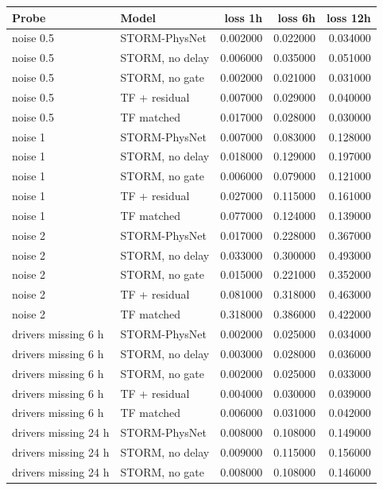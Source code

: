 \begin{tabular}{llrrr}
\toprule
Probe & Model & loss 1h & loss 6h & loss 12h \\
\midrule
noise 0.5 & STORM-PhysNet & 0.002000 & 0.022000 & 0.034000 \\
noise 0.5 & STORM, no delay & 0.006000 & 0.035000 & 0.051000 \\
noise 0.5 & STORM, no gate & 0.002000 & 0.021000 & 0.031000 \\
noise 0.5 & TF + residual & 0.007000 & 0.029000 & 0.040000 \\
noise 0.5 & TF matched & 0.017000 & 0.028000 & 0.030000 \\
noise 1 & STORM-PhysNet & 0.007000 & 0.083000 & 0.128000 \\
noise 1 & STORM, no delay & 0.018000 & 0.129000 & 0.197000 \\
noise 1 & STORM, no gate & 0.006000 & 0.079000 & 0.121000 \\
noise 1 & TF + residual & 0.027000 & 0.115000 & 0.161000 \\
noise 1 & TF matched & 0.077000 & 0.124000 & 0.139000 \\
noise 2 & STORM-PhysNet & 0.017000 & 0.228000 & 0.367000 \\
noise 2 & STORM, no delay & 0.033000 & 0.300000 & 0.493000 \\
noise 2 & STORM, no gate & 0.015000 & 0.221000 & 0.352000 \\
noise 2 & TF + residual & 0.081000 & 0.318000 & 0.463000 \\
noise 2 & TF matched & 0.318000 & 0.386000 & 0.422000 \\
drivers missing 6 h & STORM-PhysNet & 0.002000 & 0.025000 & 0.034000 \\
drivers missing 6 h & STORM, no delay & 0.003000 & 0.028000 & 0.036000 \\
drivers missing 6 h & STORM, no gate & 0.002000 & 0.025000 & 0.033000 \\
drivers missing 6 h & TF + residual & 0.004000 & 0.030000 & 0.039000 \\
drivers missing 6 h & TF matched & 0.006000 & 0.031000 & 0.042000 \\
drivers missing 24 h & STORM-PhysNet & 0.008000 & 0.108000 & 0.149000 \\
drivers missing 24 h & STORM, no delay & 0.009000 & 0.115000 & 0.156000 \\
drivers missing 24 h & STORM, no gate & 0.008000 & 0.108000 & 0.146000 \\

\end{tabular}
